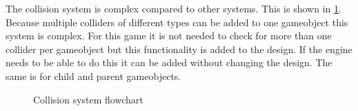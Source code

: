 \documentclass{projdoc}
\begin{document}
The collision system is complex compared to other systems. This is shown in
\cref{fig:collision-system-flowchart}. Because multiple colliders of different types
can be added to one gameobject this system is complex. For this game it is not needed
to check for more than one collider per gameobject but this functionality is added to
the design. If the engine needs to be able to do this it can be added without
changing the design. The same is for child and parent gameobjects.

\begin{figure}
	\centering
	\caption{Collision system flowchart}
	\label{fig:collision-system-flowchart}
\end{figure}
\end{document}

